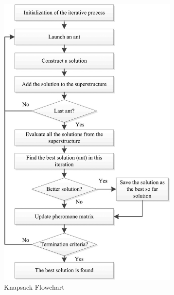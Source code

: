 \documentclass[conference]{IEEEtran}
\begin{document}
\begin{figure}[htp]
\centering
    \includegraphics[height = 15cm]{AOC Flowchart.png}
    \caption{Knapsack Flowchart}
    \label{fig : Knapsack Flowchart}
\end{figure}
\newpage
\end{document}
